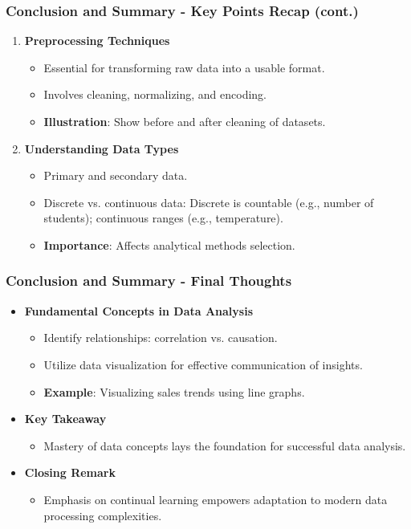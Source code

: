 \documentclass[aspectratio=169]{beamer}
\begin{document}
\begin{frame}[fragile]
    \frametitle{Conclusion and Summary - Key Points Recap (cont.)}
    \begin{enumerate}[resume]
        \item \textbf{Preprocessing Techniques}
            \begin{itemize}
                \item Essential for transforming raw data into a usable format.
                \item Involves cleaning, normalizing, and encoding.
                \item \textbf{Illustration}: Show before and after cleaning of datasets.
            \end{itemize}
        \item \textbf{Understanding Data Types}
            \begin{itemize}
                \item Primary and secondary data.
                \item Discrete vs. continuous data: Discrete is countable (e.g., number of students); continuous ranges (e.g., temperature).
                \item \textbf{Importance}: Affects analytical methods selection.
            \end{itemize}
    \end{enumerate}
\end{frame}

\begin{frame}[fragile]
    \frametitle{Conclusion and Summary - Final Thoughts}
    \begin{itemize}
        \item \textbf{Fundamental Concepts in Data Analysis}
            \begin{itemize}
                \item Identify relationships: correlation vs. causation.
                \item Utilize data visualization for effective communication of insights.
                \item \textbf{Example}: Visualizing sales trends using line graphs.
            \end{itemize}
        \item \textbf{Key Takeaway}
            \begin{itemize}
                \item Mastery of data concepts lays the foundation for successful data analysis.
            \end{itemize}
        \item \textbf{Closing Remark}
            \begin{itemize}
                \item Emphasis on continual learning empowers adaptation to modern data processing complexities.
            \end{itemize}
    \end{itemize}
\end{frame}
\end{document}
